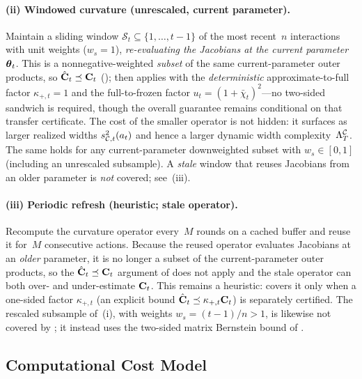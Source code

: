 \paragraph{(ii) Windowed curvature (unrescaled, current parameter).}
Maintain a sliding window $\mathcal{S}_t\subseteq\{1,\dots,t{-}1\}$ of the most
recent~$n$ interactions with unit weights ($w_s{=}1$), \emph{re-evaluating the
Jacobians at the current parameter}~$\boldsymbol{\theta}_t$.  This is a nonnegative-weighted
\emph{subset} of the same current-parameter outer products, so
$\hat{\mathbf{C}}_t\preceq\mathbf{C}_t$ ();  then
applies with the \emph{deterministic} approximate-to-full factor $\kappa_{+,t}{=}1$
and the full-to-frozen factor $u_t=(1+\bar\chi_t)^2$---no two-sided sandwich is
required, though the overall guarantee remains conditional on that transfer
certificate.  The cost of the
smaller operator is not hidden: it surfaces as larger realized widths
$s_{\mathcal{C},t}^2(a_t)$ and hence a larger dynamic width complexity~$\Lambda^{\mathcal{C}}_T$.  The
same holds for any current-parameter downweighted subset with $w_s\in[0,1]$
(including an unrescaled subsample).  A \emph{stale} window that reuses Jacobians
from an older parameter is \emph{not} covered; see~(iii).

\paragraph{(iii) Periodic refresh (heuristic; stale operator).}
Recompute the curvature operator every~$M$ rounds on a cached buffer and reuse it
for~$M$ consecutive actions.  Because the reused operator evaluates Jacobians at
an \emph{older} parameter, it is no longer a subset of the current-parameter
outer products, so the $\hat{\mathbf{C}}_t\preceq\mathbf{C}_t$ argument of  does
not apply and the stale operator can both over- and under-estimate $\mathbf{C}_t$.  This
remains a heuristic:  covers it only when a
one-sided factor $\kappa_{+,t}$ (an explicit bound
$\hat{\mathbf{C}}_t\preceq\kappa_{+,t}\mathbf{C}_t$) is separately certified.  The rescaled
subsample of~(i), with weights $w_s=(t{-}1)/n>1$, is
likewise not covered by ; it instead uses the two-sided matrix
Bernstein bound of .

\subsection{Computational Cost Model}\label{sec:systems}

